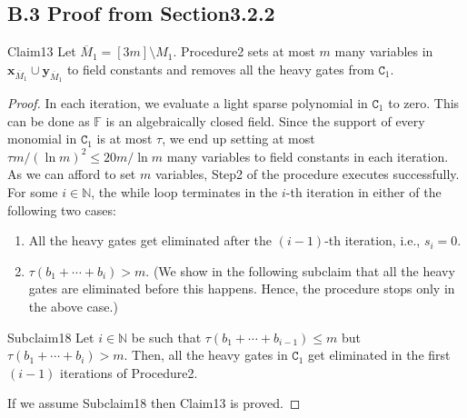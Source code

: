 \subsection*{B.3 Proof from Section3.2.2}
\begin{authorclaim}{Claim13}
Let $\overline M_1=[3m]\setminus M_1$. Procedure2 sets at most $m$ many variables in $\mathbf x_{\overline M_1}\cup\mathbf y_{\overline M_1}$ to field constants and removes all the heavy gates from $\mathtt C_1$.
\end{authorclaim}
\begin{proof}
In each iteration, we evaluate a light sparse polynomial in $\mathtt C_1$ to zero. This can be done as $\mathbb F$ is an algebraically closed field. Since the support of every monomial in $\mathtt C_1$ is at most $\tau$, we end up setting at most $\tau m/(\ln m)^2\le20m/\ln m$ many variables to field constants in each iteration. As we can afford to set $m$ variables, Step2 of the procedure executes successfully. For some $i\in\mathbb N$, the while loop terminates in the $i$-th iteration in either of the following two cases:
\begin{enumerate}
\item All the heavy gates get eliminated after the $(i-1)$-th iteration, i.e., $s_i=0$.
\item $\tau(b_1+\cdots+b_i)>m$. (We show in the following subclaim that all the heavy gates are eliminated before this happens. Hence, the procedure stops only in the above case.)
\end{enumerate}
\begin{authorclaim}{Subclaim18}
Let $i\in\mathbb N$ be such that $\tau(b_1+\cdots+b_{i-1})\le m$ but $\tau(b_1+\cdots+b_i)>m$. Then, all the heavy gates in $\mathtt C_1$ get eliminated in the first $(i-1)$ iterations of Procedure2.
\end{authorclaim}
If we assume Subclaim18 then Claim13 is proved.
\end{proof}
